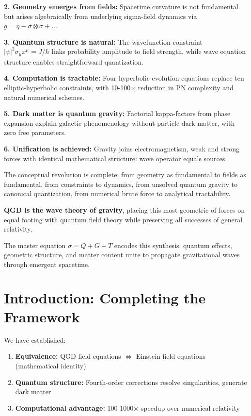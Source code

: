 \documentclass[11pt,a4paper]{article}
\theoremstyle{definition}
\theoremstyle{remark}
\begin{document}
		\textbf{2. Geometry emerges from fields:}
		Spacetime curvature is not fundamental but arises algebraically from underlying sigma-field dynamics via $g = \eta - \sigma\otimes\sigma + ...$
		
		\textbf{3. Quantum structure is natural:}
		The wavefunction constraint $|\psi|^2\sigma_\mu x^\mu = J/\hbar$ links probability amplitude to field strength, while wave equation structure enables straightforward quantization.
		
		\textbf{4. Computation is tractable:}
		Four hyperbolic evolution equations replace ten elliptic-hyperbolic constraints, with 10-100× reduction in PN complexity and natural numerical schemes.
		
		\textbf{5. Dark matter is quantum gravity:}
		Factorial kappa-factors from phase expansion explain galactic phenomenology without particle dark matter, with zero free parameters.
		
		\textbf{6. Unification is achieved:}
		Gravity joins electromagnetism, weak and strong forces with identical mathematical structure: wave operator equals sources.
		
		The conceptual revolution is complete: from geometry as fundamental to fields as fundamental, from constraints to dynamics, from unsolved quantum gravity to canonical quantization, from numerical brute force to analytical tractability.
		
		\textbf{QGD is the wave theory of gravity}, placing this most geometric of forces on equal footing with quantum field theory while preserving all successes of general relativity.
		
		The master equation $\boxed{\sigma = Q + G + T}$ encodes this synthesis: quantum effects, geometric structure, and matter content unite to propagate gravitational waves through emergent spacetime.
		
		\section{Introduction: Completing the Framework}
		
		We have established:
		\begin{enumerate}
			\item \textbf{Equivalence:} QGD field equations $\iff$ Einstein field equations (mathematical identity)
			\item \textbf{Quantum structure:} Fourth-order corrections resolve singularities, generate dark matter
			\item \textbf{Computational advantage:} 100-1000× speedup over numerical relativity
		\end{enumerate}
		
\end{document}
